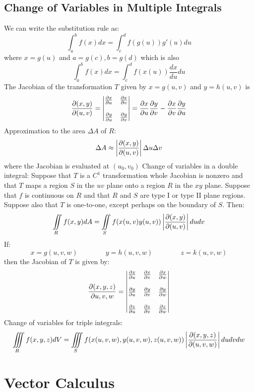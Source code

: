 \documentclass{article}
\begin{document}
    \subsection{Change of Variables in Multiple Integrals}
    \begin{outline}
        \1 We can write the substitution rule as: \[\int_a^bf(x)dx=\int_c^df(g(u))g'(u)du\] where \(x=g(u)\) and \(a=g(c),b=g(d)\) which is also \[\int_a^bf(x)dx=\int_c^df(x(u))\dfrac{dx}{du}du\]
        \1 The Jacobian of the transformation $T$ given by \(x=g(u,v)\) and \(y=h(u,v)\) is \[\pdv{(x,y)}{(u,v)}=\begin{vmatrix}
            \pdv{x}{u} & \pdv{x}{v} \\\\ \pdv{y}{u} & \pdv{y}{v}
        \end{vmatrix} = \pdv{x}{u}\pdv{y}{v}-\pdv{x}{v}\pdv{y}{u}\]
        \1 Approximation to the area \(\Delta A\) of $R$: \[\Delta A\approx\left|\pdv{(x,y)}{(u,v)}\right|\Delta u\Delta v\] where the Jacobian is evaluated at \((u_0,v_0)\)
        \1 Change of variables in a double integral: Suppose that $T$ is a \(C^1\) transformation whole Jacobian is nonzero and that $T$ maps a region $S$ in the \(uv\) plane onto a region $R$ in the \(xy\) plane. Suppose that $f$ is continuous on $R$ and that $R$ and $S$ are type I or type II plane regions. Suppose also that $T$ is one-to-one, except perhaps on the boundary of $S$. Then: \[\iint\limits_Rf(x,y)dA=\iint\limits_Sf(x(u,v)y(u,v))\left|\pdv{(x,y)}{(u,v)}\right|dudv\]
        \1 If: \[x=g(u,v,w)\qquad\qquad y=h(u,v,w)\qquad\qquad z=k(u,v,w)\] then the Jacobian of $T$ is given by: \[\pdv{(x,y,z)}{{u,v,w}}=\begin{vmatrix}
            \pdv{x}{u} & \pdv{x}{v} & \pdv{x}{w} \\\\ \pdv{y}{u} & \pdv{y}{v} & \pdv{y}{w} \\\\ \pdv{z}{u} & \pdv{z}{v} & \pdv{z}{w}
        \end{vmatrix}\]
        \1 Change of variables for triple integrals: \[\iiint\limits_Rf(x,y,z)dV=\iiint\limits_Sf(x(u,v,w),y(u,v,w),z(u,v,w))\left|\pdv{(x,y,z)}{(u,v,w)}\right| dudvdw\]
        
    \end{outline}

    \section{Vector Calculus} %
    
\end{document}
